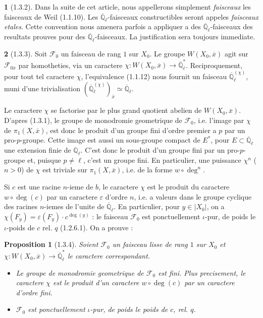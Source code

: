 \documentclass[12pt,a4paper]{article}
\theoremstyle{plain}
\newtheorem{proposition}[theorem]{Proposition}
\theoremstyle{definition}
\theoremstyle{definition}
\newtheorem{para}{}[section]
\theoremstyle{remark}
\begin{document}
\begin{para}[1.3.2]
Dans la suite de cet article, nous appellerons simplement \emph{faisceaux} les faisceaux de Weil (1.1.10). Les $\overline{\mathbb{Q}}_\ell$-faisceaux constructibles seront appeles \emph{faisceaux etales}. Cette convention nous amenera parfois a appliquer a des $\overline{\mathbb{Q}}_\ell$-faisceaux des resultats prouves pour des $\overline{\mathbb{Q}}_\ell$-faisceaux. La justification sera toujours immediate.
\end{para}

\begin{para}[1.3.3]
Soit $\mathscr{F}_0$ un faisceau de rang $1$ sur $X_0$. Le groupe $W(X_0, \overline{x})$ agit sur $\mathscr{F}_{0\overline{x}}$ par homotheties, via un caractere $\chi : W(X_0, \overline{x}) \to \overline{\mathbb{Q}}_\ell^*$. Reciproquement, pour tout tel caractere $\chi$, l'equivalence (1.1.12) nous fournit un faisceau $\overline{\mathbb{Q}}_\ell^{(\chi)}$, muni d'une trivialisation $(\overline{\mathbb{Q}}_\ell^{(\chi)})_{\overline{x}} \simeq \overline{\mathbb{Q}}_\ell$.

Le caractere $\chi$ se factorise par le plus grand quotient abelien de $W(X_0, \overline{x})$. D'apres (1.3.1), le groupe de monodromie geometrique de $\mathscr{F}_0$, i.e. l'image par $\chi$ de $\pi_1(X, \overline{x})$, est donc le produit d'un groupe fini d'ordre premier a $p$ par un pro-$p$-groupe. Cette image est aussi un sous-groupe compact de $E^*$, pour $E \subset \overline{\mathbb{Q}}_\ell$ une extension finie de $\mathbb{Q}_\ell$. C'est donc le produit d'un groupe fini par un pro-$p$-groupe et, puisque $p \neq \ell$, c'est un groupe fini. En particulier, une puissance $\chi^n$ ($n > 0$) de $\chi$ est triviale sur $\pi_1(X, \overline{x})$, i.e. de la forme $w \circ \deg^n$.

Si $c$ est une racine $n$-ieme de $b$, le caractere $\chi$ est le produit du caractere $w \circ \deg(c)$ par un caractere $\varepsilon$ d'ordre $n$, i.e. a valeurs dans le groupe cyclique des racines $n$-iemes de l'unite de $\overline{\mathbb{Q}}_\ell$. En particulier, pour $y \in |X_0|$, on a $\chi(F_y) = \varepsilon(F_y) \cdot c^{\deg(y)}$ : le faisceau $\mathscr{F}_0$ est ponctuellement $\iota$-pur, de poids le $\iota$-poids de $c$ rel. $q$ (1.2.6.1). On a prouve :
\end{para}

\begin{proposition}[1.3.4]
Soient $\mathscr{F}_0$ un faisceau lisse de rang $1$ sur $X_0$ et $\chi : W(X_0, \overline{x}) \to \overline{\mathbb{Q}}_\ell^*$ le caractere correspondant.
\begin{itemize}[nosep]
\item[(i)] Le groupe de monodromie geometrique de $\mathscr{F}_0$ est fini. Plus precisement, le caractere $\chi$ est le produit d'un caractere $w \circ \deg(c)$ par un caractere d'ordre fini.
\item[(ii)] $\mathscr{F}_0$ est ponctuellement $\iota$-pur, de poids le poids de $c$, rel. $q$.
\end{itemize}
\end{proposition}
\end{document}
